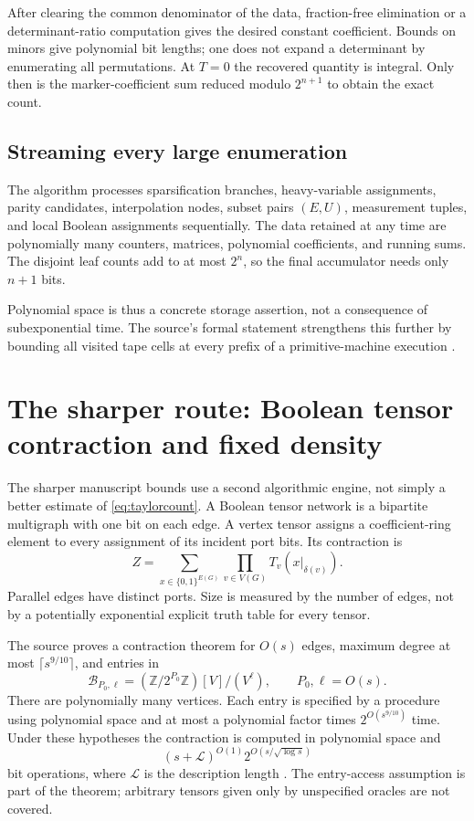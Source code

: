 \documentclass[11pt,a4paper]{article}
\numberwithin{equation}{section}
\theoremstyle{definition}
\theoremstyle{remark}
\newcommand{\Z}{\mathbb Z}
\begin{document}
After clearing the common denominator of the data, fraction-free elimination
or a determinant-ratio computation gives the desired constant coefficient.
Bounds on minors give polynomial bit lengths; one does not expand a determinant
by enumerating all permutations. At $T=0$ the recovered quantity is integral.
Only then is the marker-coefficient sum reduced modulo $2^{n+1}$ to obtain
the exact count.

\subsection{Streaming every large enumeration}
The algorithm processes sparsification branches, heavy-variable assignments,
parity candidates, interpolation nodes, subset pairs $(E,U)$, measurement
tuples, and local Boolean assignments sequentially. The data retained at any
time are polynomially many counters, matrices, polynomial coefficients, and
running sums. The disjoint leaf counts add to at most $2^n$, so the final
accumulator needs only $n+1$ bits.

Polynomial space is thus a concrete storage assertion, not a consequence of
subexponential time. The source's formal statement strengthens this further
by bounding all visited tape cells at every prefix of a primitive-machine
execution \cite{scope,challenge}.

\section{The sharper route: Boolean tensor contraction and fixed density}
\label{sec:tensorinterface}
The sharper manuscript bounds use a second algorithmic engine, not simply a
better estimate of \eqref{eq:taylorcount}. A Boolean tensor network is a
bipartite multigraph with one bit on each edge. A vertex tensor assigns a
coefficient-ring element to every assignment of its incident port bits. Its
contraction is
\[
 Z=\sum_{x\in\{0,1\}^{E(G)}}\prod_{v\in V(G)}T_v(x|_{\delta(v)}).
\]
Parallel edges have distinct ports. Size is measured by the number of edges,
not by a potentially exponential explicit truth table for every tensor.

The source proves a contraction theorem for $O(s)$ edges, maximum degree
at most $\lceil s^{9/10}\rceil$, and entries in
\[
 \mathcal B_{P_0,\ell}=(\Z/2^{P_0}\Z)[V]/(V^\ell),
 \qquad P_0,\ell=O(s).
\]
There are polynomially many vertices. Each entry is specified by a procedure
using polynomial space and at most a polynomial factor times
$2^{O(s^{9/10})}$ time. Under these hypotheses the contraction is computed
in polynomial space and
\begin{equation}\label{eq:tensorbound}
 (s+\mathcal L)^{O(1)}2^{O(s/\sqrt{\log s})}
\end{equation}
bit operations, where $\mathcal L$ is the description length
\cite{quant-reduction,quant-contraction}.
The entry-access assumption is part of the theorem; arbitrary tensors given
only by unspecified oracles are not covered.
\end{document}
